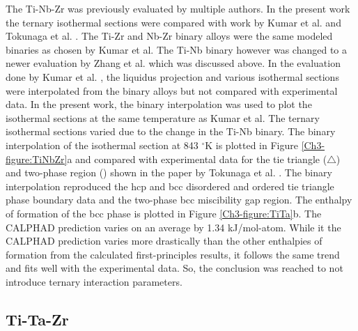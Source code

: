 The Ti-Nb-Zr was previously evaluated by multiple authors. In the present work the ternary isothermal sections were compared with work by Kumar et al. \cite{Kumar1994a} and Tokunaga et al. \cite{Tokunaga2007}. The Ti-Zr and Nb-Zr binary alloys were the same modeled binaries as chosen by Kumar et al. The Ti-Nb binary however was changed to a newer evaluation by Zhang et al. \cite{Zhang2001} which was discussed above. In the evaluation done by Kumar et al. \cite{Kumar1994a}, the liquidus projection and various isothermal sections were interpolated from the binary alloys but not compared with experimental data. In the present work, the binary interpolation was used to plot the isothermal sections at the same temperature as Kumar et al. The ternary isothermal sections varied due to the change in the Ti-Nb binary. The binary interpolation of the isothermal section at 843 $^\circ$K is plotted in Figure \ref{Ch3-figure:TiNbZr}a and compared with experimental data for the tie triangle ($\triangle$) and two-phase region (\Leftcircle) shown in the paper by Tokunaga et al. \cite{Tokunaga2007}. The binary interpolation reproduced the hcp and bcc disordered and ordered tie triangle phase boundary data and the two-phase bcc miscibility gap region. The enthalpy of formation of the bcc phase is plotted in Figure \ref{Ch3-figure:TiTa}b. The CALPHAD prediction varies on an average by 1.34 kJ/mol-atom. While it the CALPHAD prediction varies more drastically than the other enthalpies of formation from the calculated first-principles results, it follows the same trend and fits well with the experimental data. So, the conclusion was reached to not introduce ternary interaction parameters.  

\subsection{Ti-Ta-Zr}

